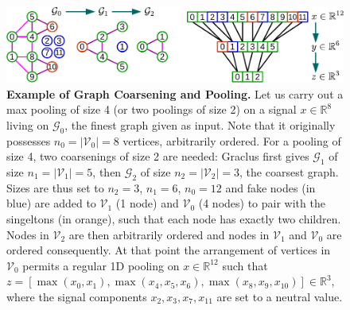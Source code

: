 \documentclass{article}
\newcommand{\G}{\mathcal{G}}
\newcommand{\V}{\mathcal{V}}
\newcommand{\R}{\mathbb{R}}
\begin{document}
\begin{figure}[t]
\centering
\includegraphics[width=\textwidth]{images/coarsening_crop}
\caption{\textbf{Example of Graph Coarsening and Pooling.} Let us carry out a max pooling of size 4 (or two poolings of size 2) on a signal $x \in
\R^8$ living on $\G_0$, the finest graph given as input. Note that it originally
possesses $n_0 = |\V_0| = 8$ vertices, arbitrarily ordered. For a pooling of
size 4, two coarsenings of size 2 are needed: Graclus first gives $\G_1$ of size
$n_1 = |\V_1| = 5$, then $\G_2$ of size $n_2 = |\V_2| = 3$, the coarsest graph.
Sizes are thus set to $n_2 = 3$, $n_1 = 6$, $n_0 = 12$ and fake nodes (in blue)
are added to $\V_1$ (1 node) and $\V_0$ (4 nodes) to pair with the singeltons
(in orange), such that each node has exactly two children.  Nodes in $\V_2$ are
then arbitrarily ordered and nodes in $\V_1$ and $\V_0$ are ordered
consequently.  At that point the arrangement of vertices in $\V_0$ permits a
regular 1D pooling on $x \in \R^{12}$ such that $z = [\max(x_0,x_1),
\max(x_4,x_5,x_6), \max(x_8,x_9,x_{10})] \in \R^3$, where the signal components
$x_2,x_3,x_7,x_{11}$ are set to a neutral value.}
\label{fig:pooling}
\end{figure}
\end{document}
